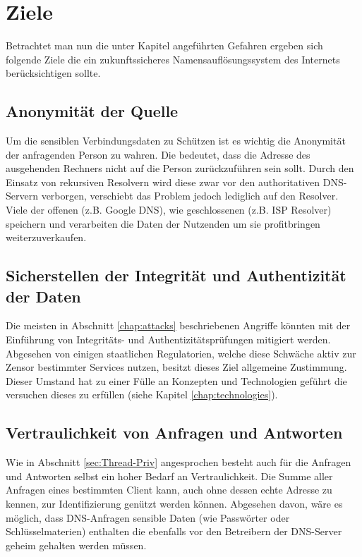 \chapter{Ziele}
\label{chap:goals}

Betrachtet man nun die unter Kapitel \label{cap:threads} angeführten Gefahren ergeben sich folgende Ziele die ein zukunftssicheres Namensauflösungssystem des Internets berücksichtigen sollte\cite{Grothoff2018}. 

\section{Anonymität der Quelle}
\label{subsec:goals-sourceanon}
Um die sensiblen Verbindungsdaten zu Schützen ist es wichtig die Anonymität der anfragenden Person zu wahren. Die bedeutet, dass die Adresse des ausgehenden Rechners nicht auf die Person zurückzuführen sein sollt. Durch den Einsatz von rekursiven Resolvern wird diese zwar vor den authoritativen DNS-Servern verborgen, verschiebt das Problem jedoch lediglich auf den Resolver. Viele der offenen (z.B. Google DNS), wie geschlossenen (z.B. ISP Resolver) speichern und verarbeiten die Daten der Nutzenden um sie profitbringen weiterzuverkaufen.

\section{Sicherstellen der Integrität und Authentizität der Daten}
\label{subsec:goals-recordsecurity}
Die meisten in Abschnitt \ref{chap:attacks} beschriebenen Angriffe könnten mit der Einführung von Integritäts- und Authentizitätsprüfungen mitigiert werden. Abgesehen von einigen staatlichen Regulatorien, welche diese Schwäche aktiv zur Zensor bestimmter Services nutzen, besitzt dieses Ziel allgemeine Zustimmung. Dieser Umstand hat zu einer Fülle an Konzepten und Technologien geführt die versuchen dieses zu erfüllen (siehe Kapitel \ref{chap:technologies}). 

\section{Vertraulichkeit von Anfragen und Antworten}
\label{subsec:goals-requestsecurity}
Wie in Abschnitt \ref{sec:Thread-Priv} angesprochen besteht auch für die Anfragen und Antworten selbst ein hoher Bedarf an Vertraulichkeit. Die Summe aller Anfragen eines bestimmten Client kann, auch ohne dessen echte Adresse zu kennen, zur Identifizierung genützt werden können. Abgesehen davon, wäre es möglich, dass DNS-Anfragen sensible Daten (wie Passwörter oder Schlüsselmaterien) enthalten die ebenfalls vor den Betreibern der DNS-Server geheim gehalten werden müssen.

